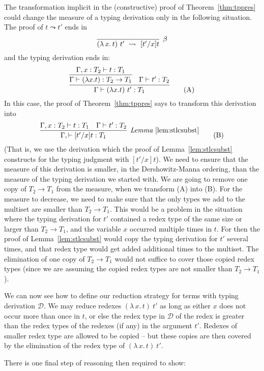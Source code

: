 \documentclass{article}
\providecommand{\betarule}[0]{\infer[\beta]{(\lambda\,x.\, t)\ t'\ \leadsto\ [t'/x]t}
                                {\ }}
\begin{document}
The transformation implicit in the (constructive) proof of Theorem~\ref{thm:tppres}
could change the measure of a typing derivation only in the following situation.  The
proof of $t \leadsto t'$ ends in
\[ 
\betarule
\]
\noindent and the typing derivation ends in:
\begin{equation} 
\infer{\Gamma \vdash (\lambda x.t)\ t' : T_1}
       {\infer{\Gamma \vdash (\lambda x.t) : T_2\to T_1}
              {\Gamma, x : T_2 \vdash t : T_1} & \Gamma \vdash t' : T_2}
\tag{A}
\end{equation}
\noindent In this case, the proof of Theorem~\ref{thm:tppres} says
to transform this derivation into
\begin{equation}
\infer[\textit{Lemma}~\ref{lem:stlcsubst}]
      {\Gamma,\vdash [t'/x]t:T_1}
      {\Gamma, x : T_2 \vdash t : T_1 & \Gamma \vdash t' : T_2}
\tag{B}
\end{equation}
\noindent (That is, we use the derivation which the proof of Lemma~\ref{lem:stlcsubst} constructs
for the typing judgment with $[t'/x]t$).  We need to ensure that the measure of this derivation is smaller,
in the Dershowitz-Manna ordering, than the measure of the typing derivation
we started with.  We are going to remove one copy of $T_2 \to T_1$ from
the measure, when we transform (A) into (B).  For the measure to decrease,
we need to make sure that the only types we add to the multiset are smaller than $T_2 \to T_1$.
This would be a problem in the situation where the typing derivation for $t'$ contained a redex
type of the same size or larger than $T_2 \to T_1$, and the variable $x$ occurred multiple times in $t$.  For then
the proof of Lemma~\ref{lem:stlcsubst} would copy the typing derivation for $t'$
several times, and that redex type would get added additional times to the multiset.  The elimination
of one copy of $T_2 \to T_1$ would not suffice to cover those copied redex types (since we are assuming
the copied redex types are not smaller than $T_2 \to T_1$).

We can now see how to define our reduction strategy for terms with
typing derivation $\mathcal{D}$.  We may reduce redexes
$(\lambda\,x.\,t)\ t'$ as long as either $x$ does not occur more than
once in $t$, or else the redex type in $\mathcal{D}$ of the redex is
greater than the redex types of the redexes (if any) in the argument
$t'$.  Redexes of smaller redex type are allowed to be copied -- but
these copies are then covered by the elimination of the redex type of
$(\lambda\,x.\,t)\ t'$.

There is one final step of reasoning then required to show:
\end{document}
